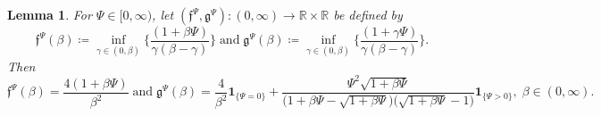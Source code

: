 \documentclass[10pt]{article} %
\newtheorem{lemma}[theorem]{Lemma}
\newcommand\ff{\mathfrak f}
\newcommand\fg{\mathfrak g}
\def \R{\mathbb{R}}
\newcommand{\1}{\mathbf{1}}
\begin{document}
\begin{lemma}\label{lem::analysis_ff_fg}
	For $\Psi \in [0,\infty)$, let $(\ff^\Psi,\fg^\Psi) : (0,\infty) \rightarrow \R \times \R$ be defined by
	\begin{equation*}
		\ff^\Psi(\beta) \coloneqq \inf_{\gamma\in (0,\beta)} \bigg\{\frac{(1+\beta\Psi)}{\gamma(\beta-\gamma)}\bigg\} \; \text{and} \; \fg^\Psi(\beta) \coloneqq \inf_{\gamma \in (0,\beta)} \bigg\{\frac{(1+\gamma\Psi)}{\gamma(\beta-\gamma)}\bigg\}.
	\end{equation*}
	Then
	\begin{equation*}
		\ff^\Psi(\beta) = \frac{4(1+\beta\Psi)}{\beta^2} \; \text{and} \; \fg^\Psi(\beta) =  \frac{4}{\beta^2}\1_{\{\Psi = 0\}} + \frac{\Psi^2  \sqrt{1+\beta\Psi}}{\big(1+\beta\Psi -\sqrt{1+\beta\Psi}\big)\big(\sqrt{1+\beta\Psi}-1\big)}\1_{\{\Psi > 0\}}, \; \beta \in (0,\infty).
	\end{equation*}
\end{lemma}
\end{document}
